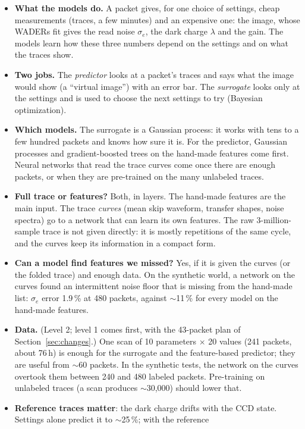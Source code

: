 \documentclass[10pt]{article}
\begin{document}
\begin{basic}
\begin{itemize}
\item \textbf{What the models do.} A packet gives, for one choice of settings, cheap measurements (traces, a few minutes) and an
  expensive one: the image, whose WADERs fit gives the read noise $\sigma_e$, the dark charge $\lambda$ and the gain. The models
  learn how these three numbers depend on the settings and on what the traces show.
\item \textbf{Two jobs.} The \emph{predictor} looks at a packet's traces and says what the image would show (a ``virtual image'')
  with an error bar. The \emph{surrogate} looks only at the settings and is used to choose the next settings to try (Bayesian
  optimization).
\item \textbf{Which models.} The surrogate is a Gaussian process: it works with tens to a few hundred packets and knows how sure it
  is. For the predictor, Gaussian processes and gradient-boosted trees on the hand-made features come first. Neural networks
  that read the trace curves come once there are enough packets, or when they are pre-trained on the many unlabeled
  traces.
\item \textbf{Full trace or features?} Both, in layers. The hand-made features are the main input. The trace \emph{curves} (mean
  skip waveform, transfer shapes, noise spectra) go to a network that can learn its own features. The raw 3-million-sample trace
  is not given directly: it is mostly repetitions of the same cycle, and the curves keep its information in a compact form.
\item \textbf{Can a model find features we missed?} Yes, if it is given the curves (or the folded trace) and enough data. On the
  synthetic world, a network on the curves found an intermittent noise floor that is missing from the hand-made list: $\sigma_e$ error
  1.9\,\% at 480 packets, against $\sim$11\,\% for every model on the hand-made features.
\item \textbf{Data.} (Level 2; level 1 comes first, with the 43-packet plan of Section~\ref{sec:changes}.) One scan of 10 parameters $\times$ 20 values (241 packets, about 76\,h) is enough for the surrogate and the
  feature-based predictor; they are useful from $\sim$60 packets. In the synthetic tests, the network on the curves overtook them between
  240 and 480 labeled packets. Pre-training on unlabeled traces (a scan produces $\sim$30{,}000) should lower that.
\item \textbf{Reference traces matter}: the dark charge drifts with the CCD state. Settings alone predict it to $\sim$25\,\%; with the reference

\end{itemize}
\end{basic}
\end{document}
